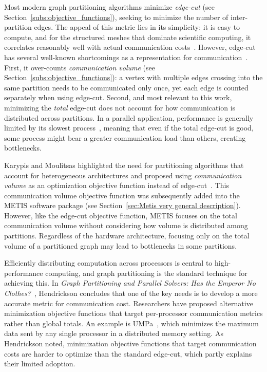 Most modern graph partitioning algorithms minimize \emph{edge-cut} (see Section~\ref{subs:objective_functions}), seeking to minimize the number of inter-partition edges. The appeal of this metric lies in its simplicity: it is easy to compute, and for the structured meshes that dominate scientific computing, it correlates reasonably well with actual communication costs~\cite{hendrickson_graph_2000}. However, edge-cut has several well-known shortcomings as a representation for communication~\cite{hendrickson_graph_2000, HENDRICKSONB1998Gpap}. First, it over-counts \textit{communication volume} (see Section~\ref{subs:objective_functions}): a vertex with multiple edges crossing into the same partition needs to be communicated only once, yet each edge is counted separately when using edge-cut. Second, and most relevant to this work, minimizing the \emph{total} edge-cut does not account for how communication is distributed across partitions. In a parallel application, performance is generally limited by its slowest process~\cite{hendrickson_graph_2000}, meaning that even if the total edge-cut is good, some process might bear a greater communication load than others, creating bottlenecks. 

Karypis and Moulitsas highlighted the need for partitioning algorithms that account for heterogeneous architectures and proposed using \emph{communication volume} as an optimization objective function instead of edge-cut~\cite{moulitsas_architecture_2008}. This communication volume objective function was subsequently added into the METIS software package (see Section~\ref{sec:Metis very general description}). However, like the edge-cut objective function, METIS focuses on the total communication volume without considering how volume is distributed among partitions. Regardless of the hardware architecture, focusing only on the total volume of a partitioned graph may lead to bottlenecks in some partitions.

Efficiently distributing computation across processors is central to high-performance computing, and graph partitioning is the standard technique for achieving this. In \textit{Graph Partitioning and Parallel Solvers: Has the Emperor No Clothes?}~\cite{HENDRICKSONB1998Gpap}, Hendrickson concludes that one of the key needs is to develop a more accurate metric for communication cost. Researchers have proposed alternative minimization objective functions that target per-processor communication metrics rather than global totals. An example is UMPa~\cite{umpa_2013}, which minimizes the maximum data sent by any single processor in a distributed memory setting. As Hendrickson noted, minimization objective functions that target communication costs are harder to optimize than the standard edge-cut, which partly explains their limited adoption.
